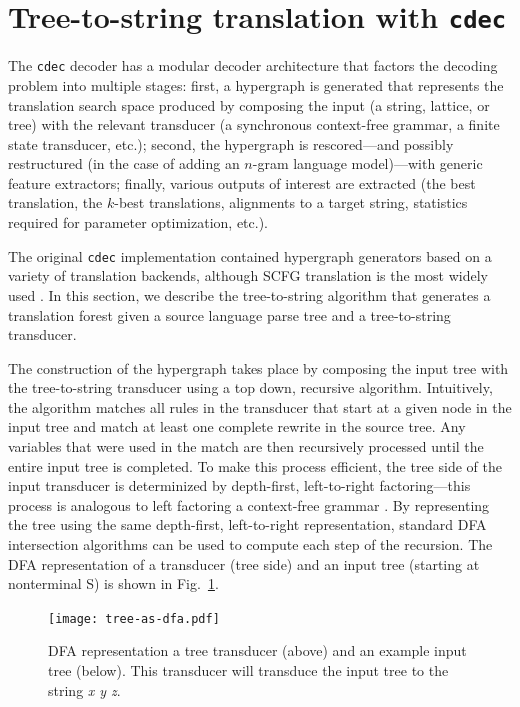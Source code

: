 \documentclass[nofonts]{pbml} %
\begin{document}
\section{Tree-to-string translation with {\tt cdec}}
\label{sec:cdec}

The {\tt cdec} decoder \citep{Dyer_etal_2010} has a modular decoder architecture that factors the decoding problem into multiple stages: first, a hypergraph is generated that represents the translation search space produced by composing the input (a string, lattice, or tree) with the relevant transducer (a synchronous context-free grammar, a finite state transducer, etc.); second, the hypergraph is rescored---and possibly restructured (in the case of adding an $n$-gram language model)---with generic feature extractors; finally, various outputs of interest are extracted (the best translation, the $k$-best translations, alignments to a target string, statistics required for parameter optimization, etc.).

The original {\tt cdec} implementation contained hypergraph generators based on a variety of translation backends, although SCFG translation is the most widely used \citep{chiang:2007}. In this section, we describe the tree-to-string algorithm that generates a translation forest given a source language parse tree and a tree-to-string transducer.

The construction of the hypergraph takes place by composing the input tree with the tree-to-string transducer using a top down, recursive algorithm. Intuitively, the algorithm matches all rules in the transducer that start at a given node in the input tree and match at least one complete rewrite in the source tree. Any variables that were used in the match are then recursively processed until the entire input tree is completed. To make this process efficient, the tree side of the input transducer is determinized by depth-first, left-to-right factoring---this process is analogous to left factoring a context-free grammar \citep{klein:2001}. By representing the tree using the same depth-first, left-to-right representation, standard DFA intersection algorithms can be used to compute each step of the recursion. The DFA representation of a transducer (tree side) and an input tree (starting at nonterminal S) is shown in Fig.~\ref{fig:det}.

\begin{figure}[t]
\centering
\texttt{[image: tree-as-dfa.pdf]}
\caption{\label{fig:det}DFA representation a tree transducer (above) and an example input tree (below). This transducer will transduce the input tree to the string \emph{x y z}.}
\end{figure}
\end{document}
